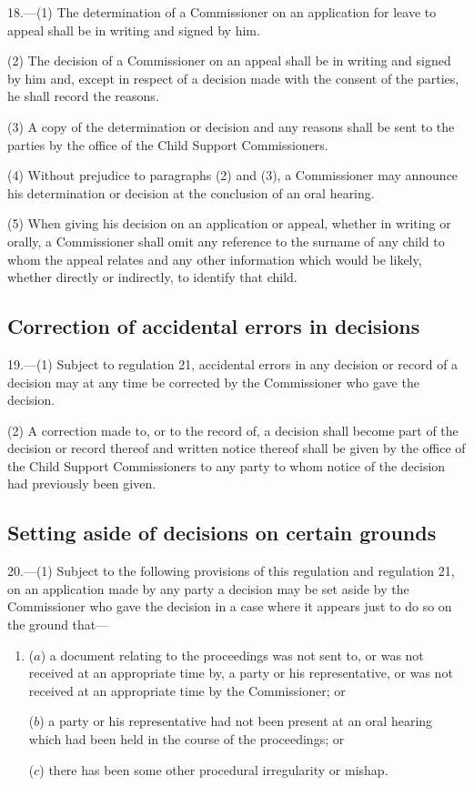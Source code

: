\documentclass[12pt,a4paper]{article}
\begin{document}
18.—(1) The determination of a Commissioner on an application for leave to appeal shall be in writing and signed by him.

(2) The decision of a Commissioner on an appeal shall be in writing and signed by him and, except in respect of a decision made with the consent of the parties, he shall record the reasons.

(3) A copy of the determination or decision and any reasons shall be sent to the parties by the office of the Child Support Commissioners.

(4) Without prejudice to paragraphs (2) and (3), a Commissioner may announce his determination or decision at the conclusion of an oral hearing.

(5) When giving his decision on an application or appeal, whether in writing or orally, a Commissioner shall omit any reference to the surname of any child to whom the appeal relates and any other information which would be likely, whether directly or indirectly, to identify that child.

\subsection[19. Correction of accidental errors in decisions]{Correction of accidental errors in decisions}

19.—(1) Subject to regulation 21, accidental errors in any decision or record of a decision may at any time be corrected by the Commissioner who gave the decision.

(2) A correction made to, or to the record of, a decision shall become part of the decision or record thereof and written notice thereof shall be given by the office of the Child Support Commissioners to any party to whom notice of the decision had previously been given.

\subsection[20. Setting aside of decisions on certain grounds]{Setting aside of decisions on certain grounds}

20.—(1) Subject to the following provisions of this regulation and regulation 21, on an application made by any party a decision may be set aside by the Commissioner who gave the decision in a case where it appears just to do so on the ground that—
\begin{enumerate}\item[]
($a$) a document relating to the proceedings was not sent to, or was not received at an appropriate time by, a party or his representative, or was not received at an appropriate time by the Commissioner; or

($b$) a party or his representative had not been present at an oral hearing which had been held in the course of the proceedings; or

($c$) there has been some other procedural irregularity or mishap.
\end{enumerate}
\end{document}
